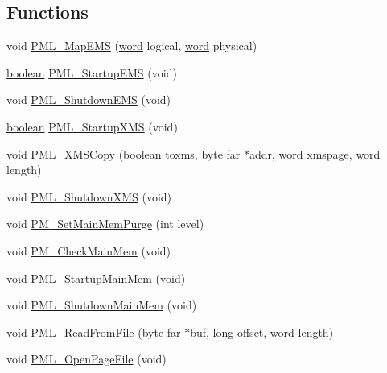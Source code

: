 \subsection*{Functions}
\begin{DoxyCompactItemize}
\item 
void \hyperlink{ID__PM_8C_ab2f720eba0924c15d0a7c6a487fc0626}{PML\_\-MapEMS} (\hyperlink{ID__HEAD_8H_abad51e07ab6d26bec9f1f786c8d65bcd}{word} logical, \hyperlink{ID__HEAD_8H_abad51e07ab6d26bec9f1f786c8d65bcd}{word} physical)
\item 
\hyperlink{ID__HEAD_8H_a7c6368b321bd9acd0149b030bb8275ed}{boolean} \hyperlink{ID__PM_8C_a6085844cd57a807307a56cd8246e2bd2}{PML\_\-StartupEMS} (void)
\item 
void \hyperlink{ID__PM_8C_aadca17cdf940e28b8da2e6d1f19fd791}{PML\_\-ShutdownEMS} (void)
\item 
\hyperlink{ID__HEAD_8H_a7c6368b321bd9acd0149b030bb8275ed}{boolean} \hyperlink{ID__PM_8C_ab211699b43c5415d19e7c2ff618bcbb7}{PML\_\-StartupXMS} (void)
\item 
void \hyperlink{ID__PM_8C_adbf449e02e6c97248f39c51e8ced3238}{PML\_\-XMSCopy} (\hyperlink{ID__HEAD_8H_a7c6368b321bd9acd0149b030bb8275ed}{boolean} toxms, \hyperlink{ID__HEAD_8H_a0c8186d9b9b7880309c27230bbb5e69d}{byte} far $\ast$addr, \hyperlink{ID__HEAD_8H_abad51e07ab6d26bec9f1f786c8d65bcd}{word} xmspage, \hyperlink{ID__HEAD_8H_abad51e07ab6d26bec9f1f786c8d65bcd}{word} length)
\item 
void \hyperlink{ID__PM_8C_a363e2f98515f8d1e08746e89465d2e24}{PML\_\-ShutdownXMS} (void)
\item 
void \hyperlink{ID__PM_8C_a5182c3fcfa8dd2f64fa5e9b8254dc991}{PM\_\-SetMainMemPurge} (int level)
\item 
void \hyperlink{ID__PM_8C_a2a4e1e1198255c4890972680f9fb5a15}{PM\_\-CheckMainMem} (void)
\item 
void \hyperlink{ID__PM_8C_a8cecebd101b586366e04355a3914427b}{PML\_\-StartupMainMem} (void)
\item 
void \hyperlink{ID__PM_8C_a788c597ebc679e6114cafede80c05388}{PML\_\-ShutdownMainMem} (void)
\item 
void \hyperlink{ID__PM_8C_a3e8875fd1618f89f3e98f9d2ae4f0945}{PML\_\-ReadFromFile} (\hyperlink{ID__HEAD_8H_a0c8186d9b9b7880309c27230bbb5e69d}{byte} far $\ast$buf, long offset, \hyperlink{ID__HEAD_8H_abad51e07ab6d26bec9f1f786c8d65bcd}{word} length)
\item 
void \hyperlink{ID__PM_8C_a64c6a16ef9e07fadf7fbde9b90565e4e}{PML\_\-OpenPageFile} (void)
\item 

\end{DoxyCompactItemize}
